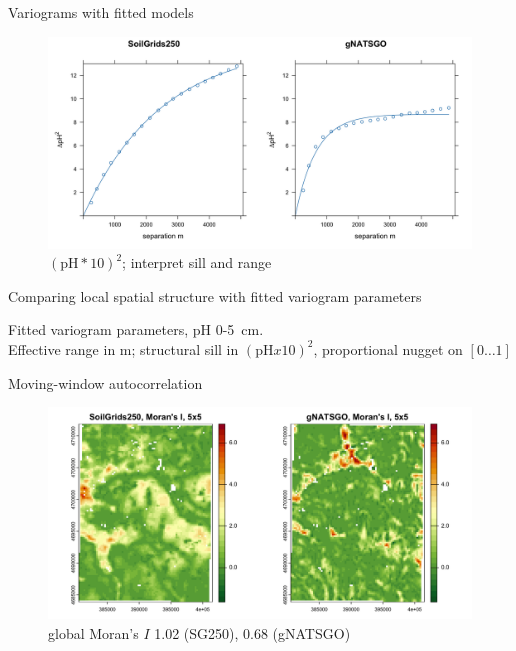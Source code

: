 \documentclass[aspectratio=169]{beamer}
\begin{document}
\begin{frame}{Variograms with fitted models}
    \begin{figure}
        \centering
        \includegraphics[height=0.6\textheight]{./graphics_david/variograms.png}
\\${(\mathrm{pH} * 10)}^2$; interpret sill and range
    \end{figure}
\end{frame}

\begin{frame}{Comparing local spatial structure with fitted variogram parameters}



\par
Fitted variogram parameters, pH 0-5~cm.
\\
Effective range in m; structural sill in $(\mathrm{pH}x10)^2$, proportional nugget on $[0 \ldots 1]$    
\end{frame}

\begin{frame}{Moving-window autocorrelation}
    \begin{figure}
        \centering
        \includegraphics[height=0.7\textheight]{./graphics_david/moving-window-5-1.png}
        \\global Moran's $I$ 1.02 (SG250), 0.68 (gNATSGO)
    \end{figure}
\end{frame}
\end{document}
